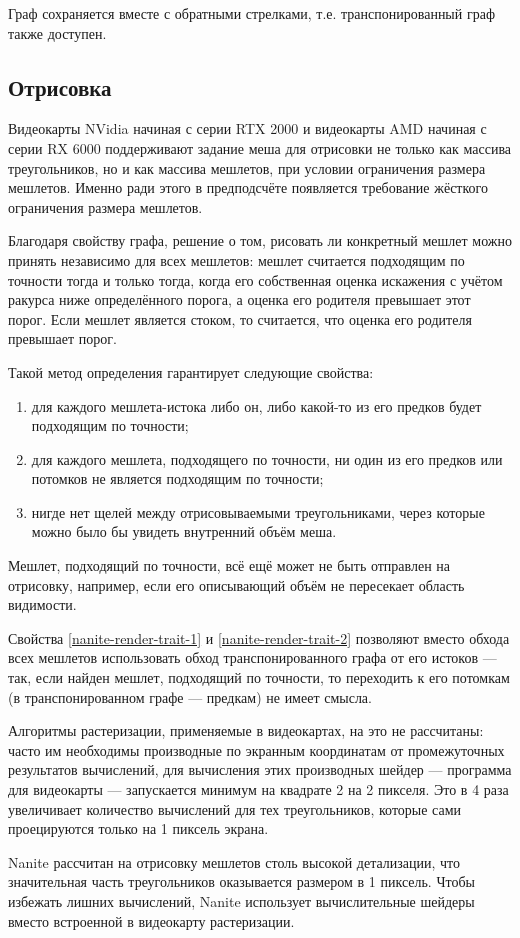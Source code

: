 Граф сохраняется вместе с обратными стрелками, т.е. транспонированный граф также доступен.

\subsection*{Отрисовка}
Видеокарты NVidia начиная с серии RTX 2000 и видеокарты AMD начиная с серии RX 6000 поддерживают задание меша для отрисовки не только как массива треугольников, но и как массива мешлетов, при условии ограничения размера мешлетов.
Именно ради этого в предподсчёте появляется требование жёсткого ограничения размера мешлетов.

Благодаря свойству графа, решение о том, рисовать ли конкретный мешлет можно принять независимо для всех мешлетов: мешлет считается подходящим по точности тогда и только тогда, когда его собственная оценка искажения с учётом ракурса ниже определённого порога, а оценка его родителя превышает этот порог.
Если мешлет является стоком, то считается, что оценка его родителя превышает порог.

Такой метод определения гарантирует следующие свойства:
\begin{enumerate}
    \item для каждого мешлета-истока либо он, либо какой-то из его предков будет подходящим по точности;
    \label{nanite-render-trait-1}
    \item для каждого мешлета, подходящего по точности, ни один из его предков или потомков не является подходящим по точности;
    \label{nanite-render-trait-2}
    \item нигде нет щелей между отрисовываемыми треугольниками, через которые можно было бы увидеть внутренний объём меша.
\end{enumerate}

Мешлет, подходящий по точности, всё ещё может не быть отправлен на отрисовку, например, если его описывающий объём не пересекает область видимости.

Свойства \ref{nanite-render-trait-1} и \ref{nanite-render-trait-2} позволяют вместо обхода всех мешлетов использовать обход транспонированного графа от его истоков --- так, если найден мешлет, подходящий по точности, то переходить к его потомкам (в транспонированном графе --- предкам) не имеет смысла.

Алгоритмы растеризации, применяемые в видеокартах, на это не рассчитаны: часто им необходимы производные по экранным координатам от промежуточных результатов вычислений, для вычисления этих производных шейдер --- программа для видеокарты --- запускается минимум на квадрате 2 на 2 пикселя.
Это в 4 раза увеличивает количество вычислений для тех треугольников, которые сами проецируются только на 1 пиксель экрана.

Nanite рассчитан на отрисовку мешлетов столь высокой детализации, что значительная часть треугольников оказывается размером в 1 пиксель.
Чтобы избежать лишних вычислений, Nanite использует вычислительные шейдеры вместо встроенной в видеокарту растеризации.

